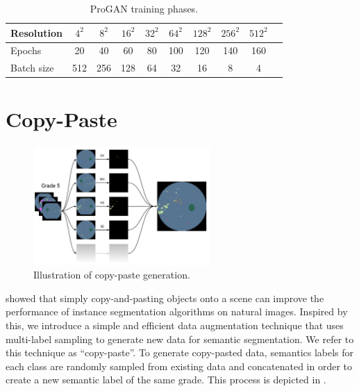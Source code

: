 \begin{table}[h]
    \centering
    \begin{tabular}{lccccccccc}
        \toprule
        Resolution & $4^2$ & $8^2$ & $16^2$ & $32^2$ & $64^2$& $128^2$& $256^2$& $512^2$ \\
        \midrule
        Epochs & 20 & 40 & 60 & 80 & 100 & 120 & 140 & 160 \\
        Batch size & 512 & 256 & 128 & 64 & 32 & 16 & 8 & 4 \\
        \bottomrule
    \end{tabular}
    \caption{ProGAN training phases.}
    \label{tab:progan_training}
\end{table}

% 

\section{Copy-Paste}

\begin{figure}[h]
    \centering
    \includegraphics[width=0.6\textwidth]{labels/figs/copy-paste}
    \caption{Illustration of copy-paste generation.}
    \label{fig:copypaste}
\end{figure}

\citeauthor{ghiasi2020simple} \cite{ghiasi2020simple} showed that simply copy-and-pasting objects onto a scene can improve the performance of instance segmentation algorithms on natural images.
Inspired by this, we introduce a simple and efficient data augmentation technique that uses multi-label sampling to generate new data for semantic segmentation.
We refer to this technique as ``copy-paste''.
To generate copy-pasted data, semantics labels for each class are randomly sampled from existing data and concatenated in order to create a new semantic label of the same grade.
This process is depicted in .

